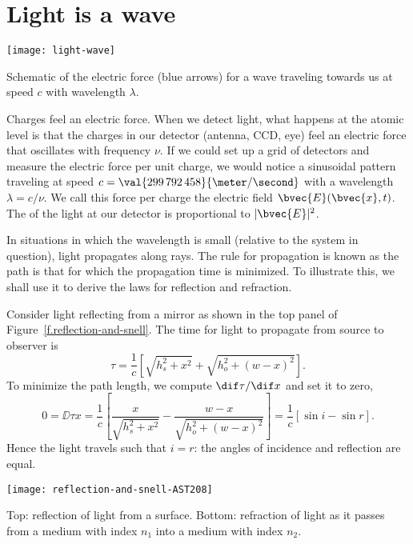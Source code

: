 \section{Light is a wave}

\begin{marginfigure}
\texttt{[image: light-wave]}
\caption[The electric force in a light wave]{Schematic of the electric force (blue arrows) for a wave traveling towards us at speed $c$ with wavelength $\lambda$.}
\label{f.light-wave}
\end{marginfigure}
Charges feel an electric force.
When we detect light, what happens at the atomic level is that the charges in our detector (antenna, CCD, eye) feel an electric force that oscillates with frequency $\nu$. If we could set up a grid of detectors and measure the electric force per unit charge, we would notice a sinusoidal pattern traveling at speed $c = \val{299\,792\,458}{\meter/\second}$ with a wavelength $\lambda = c/\nu$.  We call this force per charge the electric field $\bvec{E}(\bvec{x},t)$. The  of the light at our detector is proportional to $|\bvec{E}|^{2}$.

In situations in which the wavelength is small (relative to the system in question), light propagates along rays.  The rule for propagation is known as  the path is that for which the propagation time is minimized. To illustrate this, we shall use it to derive the laws for reflection and refraction.

Consider light reflecting from a mirror as shown in the top panel of Figure~\ref{f.reflection-and-snell}. The time for light to propagate from source to observer is
\[	\tau = \frac{1}{c}\left[\sqrt{h_{s}^{2}+x^{2}} + \sqrt{h_{o}^{2} + (w-x)^{2}}\right]. \]
To minimize the path length, we compute $\dif\tau/\dif x$ and set it to zero,
\[
	0 = \DD{\tau}{x} = \frac{1}{c}\left[\frac{x}{\sqrt{h_{s}^{2}+x^{2}}} 
	- \frac{w-x}{\sqrt{h_{o}^{2} + (w-x)^{2}}}\right] = \frac{1}{c}\left[\sin i - \sin r\right].
\]
Hence the light travels such that $i = r$: the angles of incidence and reflection are equal.

\begin{marginfigure}
\texttt{[image: reflection-and-snell-AST208]}
\caption[Reflection and refraction]{Top: reflection of light from a surface. Bottom: refraction of light as it passes from a medium with index $n_{1}$ into a medium with index $n_{2}$.
\label{f.reflection-and-snell}}
\end{marginfigure}

